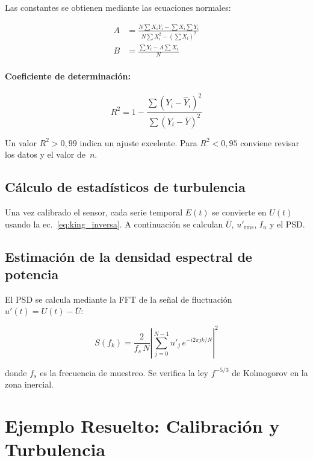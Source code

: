 \documentclass[12pt,a4paper]{article}
\begin{document}
Las constantes se obtienen mediante las ecuaciones normales:

\begin{align}
	A & = \frac{N\sum X_i Y_i - \sum X_i \sum Y_i}
	{N\sum X_i^2 - (\sum X_i)^2}
	\label{eq:A_normal}                            \\
	B & = \frac{\sum Y_i - A\sum X_i}{N}
	\label{eq:B_normal}
\end{align}

\paragraph{Coeficiente de determinación:}
\begin{equation}
	R^2 = 1 - \frac{\sum(Y_i - \hat{Y}_i)^2}{\sum(Y_i - \bar{Y})^2}
	\label{eq:R2}
\end{equation}

Un valor $R^2 > 0{,}99$ indica un ajuste excelente.  Para $R^2 < 0{,}95$
conviene revisar los datos y el valor de~$n$.

\subsection{Cálculo de estadísticos de turbulencia}

Una vez calibrado el sensor, cada serie temporal $E(t)$ se convierte en
$U(t)$ usando la ec.~\eqref{eq:king_inversa}.  A continuación se calculan
$\bar{U}$, $u'_\mathrm{rms}$, $I_u$ y el PSD.

\subsection{Estimación de la densidad espectral de potencia}

El PSD se calcula mediante la FFT de la señal de fluctuación
$u'(t) = U(t) - \bar{U}$:

\begin{equation}
	S(f_k) = \frac{2}{f_s\,N}\left|\sum_{j=0}^{N-1}
	u'_j\,e^{-i2\pi jk/N}\right|^2
	\label{eq:PSD}
\end{equation}

donde $f_s$ es la frecuencia de muestreo.  Se verifica la ley
$f^{-5/3}$ de Kolmogorov en la zona inercial.

\section{Ejemplo Resuelto: Calibración y Turbulencia}
\label{sec:ejemplo}
\end{document}

